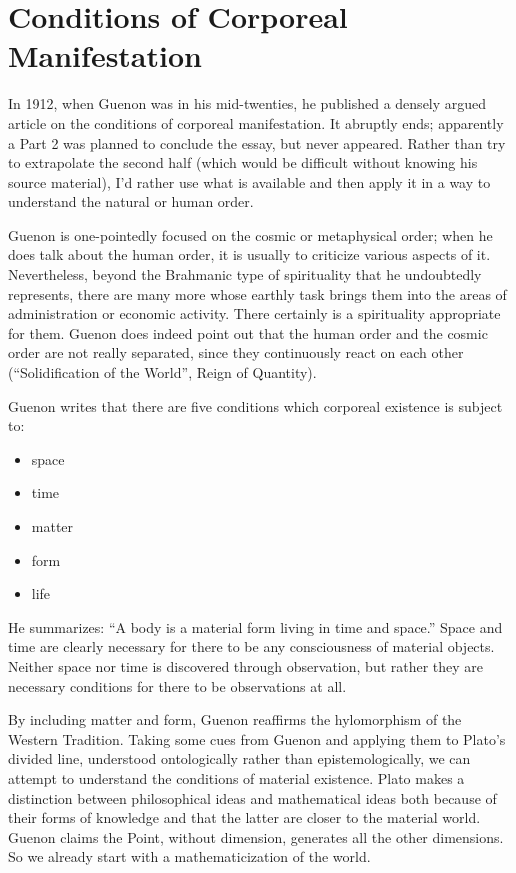 \section{Conditions of Corporeal Manifestation}

In 1912, when Guenon was in his mid-twenties, he published a densely argued article on the conditions of corporeal manifestation. It abruptly ends; apparently a Part 2 was planned to conclude the essay, but never appeared. Rather than try to extrapolate the second half (which would be difficult without knowing his source material), I'd rather use what is available and then apply it in a way to understand the natural or human order.

Guenon is one-pointedly focused on the cosmic or metaphysical order; when he does talk about the human order, it is usually to criticize various aspects of it. Nevertheless, beyond the Brahmanic type of spirituality that he undoubtedly represents, there are many more whose earthly task brings them into the areas of administration or economic activity. There certainly is a spirituality appropriate for them. Guenon does indeed point out that the human order and the cosmic order are not really separated, since they continuously react on each other (``Solidification of the World'', Reign of Quantity).

Guenon writes that there are five conditions which corporeal existence is subject to:

\begin{itemize}
\item space
\item time
\item matter
\item form
\item life
\end{itemize}

He summarizes: ``A body is a material form living in time and space.'' Space and time are clearly necessary for there to be any consciousness of material objects. Neither space nor time is discovered through observation, but rather they are necessary conditions for there to be observations at all.

By including matter and form, Guenon reaffirms the hylomorphism of the Western Tradition. Taking some cues from Guenon and applying them to Plato's divided line, understood ontologically rather than epistemologically, we can attempt to understand the conditions of material existence. Plato makes a distinction between philosophical ideas and mathematical ideas both because of their forms of knowledge and that the latter are closer to the material world. Guenon claims the Point, without dimension, generates all the other dimensions. So we already start with a mathematicization of the world.

